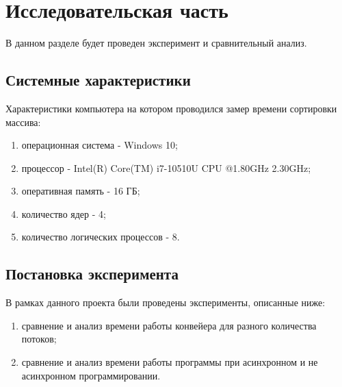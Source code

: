 \documentclass[a4paper, 12pt]{article}
\begin{document}
\section{Исследовательская часть }
\begin{flushleft}
	\hspace*{5mm} В данном разделе будет проведен эксперимент и сравнительный анализ.
	\subsection{Системные характеристики}
	Характеристики компьютера на котором проводился замер времени сортировки массива:
	\begin{enumerate}
		\item операционная система - Windows 10;
		\item процессор - Intel(R) Core(TM) i7-10510U CPU @1.80GHz 2.30GHz;
		\item оперативная память - 16 ГБ;
		\item количество ядер - 4;
		\item количество логических процессов - 8.
	\end{enumerate}
	\subsection{Постановка эксперимента}
	В рамках данного проекта были проведены эксперименты, описанные ниже:
	\begin{enumerate}
		\item сравнение и анализ времени работы конвейера для разного количества потоков;
		\item сравнение и анализ времени работы программы при асинхронном и не асинхронном программировании.
	\end{enumerate}
	\clearpage
	\newpage

\end{flushleft}
\end{document}
